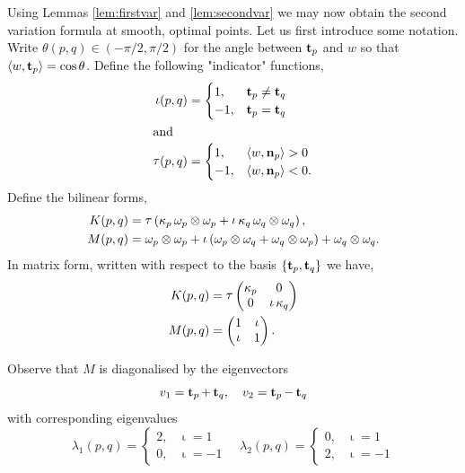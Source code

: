 \documentclass[11pt]{amsart}
\DeclareMathOperator{\tangindicator}{\iota}
\DeclareMathOperator{\norindicator}{\tau}
\begin{document}
Using Lemmas \ref{lem:firstvar} and \ref{lem:secondvar} we may now obtain the second variation formula at smooth, optimal points. Let us first introduce some notation. Write \(\theta(p,q) \in (-\pi/2, \pi/2)\) for the angle between \(\operatorname{\mathbf{t}}_{p}\) and \(w\) so that \(\langle{w},{\operatorname{\mathbf{t}}_p}\rangle = \cos\theta\). Define the following "indicator" functions,
\begin{align*}
\tangindicator(p, q) &= \begin{cases}
1,& \tang_{p} \ne \tang_{q} \\
-1,& \tang_{p} = \tang_{q}
\end{cases} \\
\intertext{and}
\norindicator(p, q) &= \begin{cases}
1,& \ip{w}{\nor_{p}} > 0 \\
-1,& \ip{w}{\nor_{p}} < 0.
\end{cases}
\end{align*}
Define the bilinear forms,
\begin{align*}
K(p, q) &= \norindicator \left(\curvecurv_p \omega_p \otimes \omega_p + \tangindicator \curvecurv_q \omega_q \otimes \omega_q\right), \\
M(p, q) &= \omega_p \otimes \omega_p + \tangindicator\left(\omega_p \otimes \omega_q + \omega_q \otimes \omega_p\right) + \omega_q \otimes \omega_q.
\end{align*}
In matrix form, written with respect to the basis \(\{\operatorname{\mathbf{t}}_p, \operatorname{\mathbf{t}}_q\}\) we have,
\begin{align*}
K(p,q) &= \norindicator\begin{pmatrix}
\curvecurv_{p} & 0 \\
0 & \tangindicator \curvecurv_{q}
\end{pmatrix} \\
M(p,q) &= \begin{pmatrix}
1 & \tangindicator \\
\tangindicator & 1
\end{pmatrix}.
\end{align*}

Observe that \(M\) is diagonalised by the eigenvectors
\begin{equation}
\label{eq:eigenvectors}
v_1 = \operatorname{\mathbf{t}}_{p} + \operatorname{\mathbf{t}}_{q}, \quad v_2 = \operatorname{\mathbf{t}}_{p} - \operatorname{\mathbf{t}}_{q}
\end{equation}
with corresponding eigenvalues
\begin{equation}
\label{eq:eigenvalues}
\lambda_1 (p, q) = \begin{cases}
2, & \tangindicator = 1 \\
0, & \tangindicator = -1
\end{cases}
\quad
\lambda_2 (p, q) = \begin{cases}
0, & \tangindicator = 1 \\
2, & \tangindicator = -1
\end{cases}
\end{equation}
\end{document}
